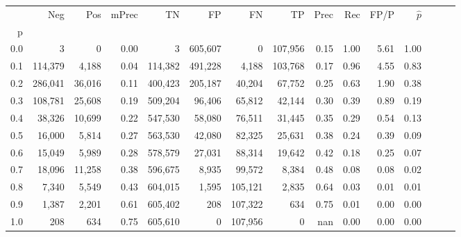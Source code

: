 \begin{tabular}{rrrrrrrrrrrrrrr}
\toprule
{} &      Neg &     Pos & mPrec &       TN &       FP &       FN &       TP &  Prec &   Rec &  FP/P & $\hat{p}$ \\
p   &          &         &       &          &          &          &          &       &       &       &           \\
\midrule
0.0 &        3 &       0 &  0.00 &        3 &  605,607 &        0 &  107,956 &  0.15 &  1.00 &  5.61 &      1.00 \\
0.1 &  114,379 &   4,188 &  0.04 &  114,382 &  491,228 &    4,188 &  103,768 &  0.17 &  0.96 &  4.55 &      0.83 \\
0.2 &  286,041 &  36,016 &  0.11 &  400,423 &  205,187 &   40,204 &   67,752 &  0.25 &  0.63 &  1.90 &      0.38 \\
0.3 &  108,781 &  25,608 &  0.19 &  509,204 &   96,406 &   65,812 &   42,144 &  0.30 &  0.39 &  0.89 &      0.19 \\
0.4 &   38,326 &  10,699 &  0.22 &  547,530 &   58,080 &   76,511 &   31,445 &  0.35 &  0.29 &  0.54 &      0.13 \\
0.5 &   16,000 &   5,814 &  0.27 &  563,530 &   42,080 &   82,325 &   25,631 &  0.38 &  0.24 &  0.39 &      0.09 \\
0.6 &   15,049 &   5,989 &  0.28 &  578,579 &   27,031 &   88,314 &   19,642 &  0.42 &  0.18 &  0.25 &      0.07 \\
0.7 &   18,096 &  11,258 &  0.38 &  596,675 &    8,935 &   99,572 &    8,384 &  0.48 &  0.08 &  0.08 &      0.02 \\
0.8 &    7,340 &   5,549 &  0.43 &  604,015 &    1,595 &  105,121 &    2,835 &  0.64 &  0.03 &  0.01 &      0.01 \\
0.9 &    1,387 &   2,201 &  0.61 &  605,402 &      208 &  107,322 &      634 &  0.75 &  0.01 &  0.00 &      0.00 \\
1.0 &      208 &     634 &  0.75 &  605,610 &        0 &  107,956 &        0 &   nan &  0.00 &  0.00 &      0.00 \\
\bottomrule
\end{tabular}
